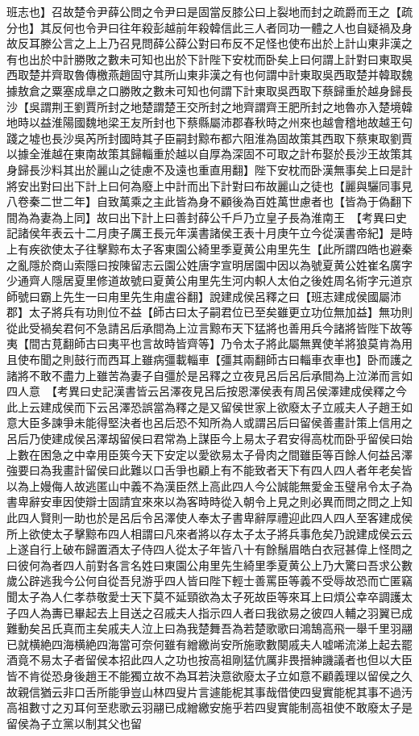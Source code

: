 班志也】召故楚令尹薛公問之令尹曰是固當反膝公曰上裂地而封之疏爵而王之【疏分也】其反何也令尹曰往年殺彭越前年殺韓信此三人者同功一體之人也自疑禍及身故反耳滕公言之上上乃召見問薛公薛公對曰布反不足怪也使布出於上計山東非漢之有也出於中計勝敗之數未可知也出於下計陛下安枕而卧矣上曰何謂上計對曰東取吳西取楚并齊取魯傳檄燕趙固守其所山東非漢之有也何謂中計東取吳西取楚并韓取魏據敖倉之粟塞成臯之口勝敗之數未可知也何謂下計東取吳西取下蔡歸重於越身歸長沙【吳謂荆王劉賈所封之地楚謂楚王交所封之地齊謂齊王肥所封之地魯亦入楚境韓地時以益淮陽國魏地梁王友所封也下蔡縣屬沛郡春秋時之州來也越會稽地故越王句踐之墟也長沙吳芮所封國時其子臣嗣封黥布都六阻淮為固故策其西取下蔡東取劉賈以據全淮越在東南故策其歸輜重於越以自厚為深固不可取之計布娶於長沙王故策其身歸長沙料其出於麗山之徒慮不及遠也重直用翻】陛下安枕而卧漢無事矣上曰是計將安出對曰出下計上曰何為廢上中計而出下計對曰布故麗山之徒也【麗與驪同事見八卷秦二世二年】自致萬乘之主此皆為身不顧後為百姓萬世慮者也【皆為于偽翻下間為為妻為上同】故曰出下計上曰善封薛公千戶乃立皇子長為淮南王　【考異曰史記諸侯年表云十二月庚子厲王長元年漢書諸侯王表十月庚午立今從漢書帝紀】是時上有疾欲使太子往擊黥布太子客東園公綺里季夏黄公甪里先生【此所謂四皓也避秦之亂隱於商山索隱曰按陳留志云園公姓唐字宣明居園中因以為號夏黄公姓崔名廣字少通齊人隱居夏里修道故號曰夏黄公甪里先生河内軹人太伯之後姓周名術字元道京師號曰霸上先生一曰甪里先生甪盧谷翻】說建成侯呂釋之曰【班志建成侯國屬沛郡】太子將兵有功則位不益【師古曰太子嗣君位已至矣雖更立功位無加益】無功則從此受禍矣君何不急請呂后承間為上泣言黥布天下猛將也善用兵今諸將皆陛下故等夷【間古莧翻師古曰夷平也言故時皆齊等】乃令太子將此屬無異使羊將狼莫肯為用且使布聞之則鼓行而西耳上雖病彊載輜車【彊其兩翻師古曰輜車衣車也】卧而護之諸將不敢不盡力上雖苦為妻子自彊於是呂釋之立夜見呂后呂后承間為上泣涕而言如四人意　【考異曰史記漢書皆云呂澤夜見呂后按恩澤侯表有周呂侯澤建成侯釋之今此上云建成侯而下云呂澤恐誤當為釋之是又留侯世家上欲廢太子立戚夫人子趙王如意大臣多諫爭未能得堅決者也呂后恐不知所為人或謂呂后曰留侯善畫計策上信用之呂后乃使建成侯呂澤刼留侯曰君常為上謀臣今上易太子君安得高枕而卧乎留侯曰始上數在困急之中幸用臣筴今天下安定以愛欲易太子骨肉之間雖臣等百餘人何益呂澤強要曰為我畫計留侯曰此難以口舌爭也顧上有不能致者天下有四人四人者年老矣皆以為上嫚侮人故逃匿山中義不為漢臣然上高此四人今公誠能無愛金玉璧帛令太子為書卑辭安車因使辯士固請宜來來以為客時時從入朝令上見之則必異而問之問之上知此四人賢則一助也於是呂后令呂澤使人奉太子書卑辭厚禮迎此四人四人至客建成侯所上欲使太子擊黥布四人相謂曰凡來者將以存太子太子將兵事危矣乃說建成侯云云上遂自行上破布歸置酒太子侍四人從太子年皆八十有餘鬚眉皓白衣冠甚偉上怪問之曰彼何為者四人前對各言名姓曰東園公甪里先生綺里季夏黄公上乃大驚曰吾求公數歲公辟逃我今公何自從吾兒游乎四人皆曰陛下輕士善罵臣等義不受辱故恐而亡匿竊聞太子為人仁孝恭敬愛士天下莫不延頸欲為太子死故臣等來耳上曰煩公幸卒調護太子四人為夀已畢起去上目送之召戚夫人指示四人者曰我欲易之彼四人輔之羽翼已成難動矣呂氏真而主矣戚夫人泣上曰為我楚舞吾為若楚歌歌曰鴻鵠高飛一舉千里羽翮已就横絶四海横絶四海當可奈何雖有繒繳尚安所施歌數闋戚夫人嘘唏流涕上起去罷酒竟不易太子者留侯本招此四人之功也按高祖剛猛伉厲非畏搢紳譏議者也但以大臣皆不肯從恐身後趙王不能獨立故不為耳若決意欲廢太子立如意不顧義理以留侯之久故親信猶云非口舌所能爭豈山林四叟片言遽能柅其事哉借使四叟實能柅其事不過汚高祖數寸之刃耳何至悲歌云羽翮已成繒繳安施乎若四叟實能制高祖使不敢廢太子是留侯為子立黨以制其父也留